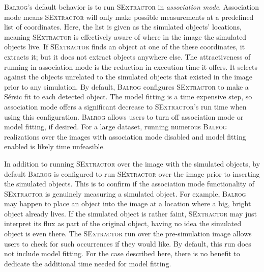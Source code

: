 \documentclass[11pt]{book}
\newcommand{\balrog}{\textsc{Balrog}}
\newcommand{\sex}{\textsc{SExtractor}}
\newcommand{\sersic}{S\'{e}rsic}
\begin{document}
\hypertarget{hyper:assoc}{}
\balrog{}'s default behavior is to run \sex{} in \emph{association mode}.
Association mode means \sex{} will only make possible measurements at a predefined list of coordinates.
Here, the list is given as the simulated objects' locations,
meaning \sex{} is effectively aware of where in the image the simulated objects live.
If \sex{} finds an object at one of the these coordinates, it extracts it; but it does not extract objects anywhere else.
The attractiveness of running in association mode is the reduction in execution time it offers.
It  selects against the objects unrelated to the simulated objects that existed in the image prior to any simulation.
By default, \balrog{} configures \sex{} to make a \sersic{} fit to each detected object.
The model fitting is a time expensive step, so association mode offers a significant decrease
to \sex{}'s run time  when using this configuration.
\balrog{} allows users to turn off association mode or model fitting, if desired.
For a large dataset, running numerous \balrog{} realizations over the images
with association mode disabled and model fitting enabled is likely time unfeasible.

In addition to running \sex{} over the image with the simulated objects,
by default \balrog{} is configured to run \sex{} over the image prior to inserting the simulated objects.
This is to confirm if the association mode functionality of \sex{} is genuinely measuring a simulated object.
For example, \balrog{} may happen to place an object into the image at a location where a big, bright object already lives.
If the simulated object is rather faint, \sex{} may just interpret its flux as part of the original object, having no
idea the simulated object is even there. The \sex{} run over the pre-simulation image allows users to check
for such occurrences if they would like. By default, this run does not include model fitting.
For the case described here, there is no benefit to dedicate the additional time needed for model fitting.
\end{document}
